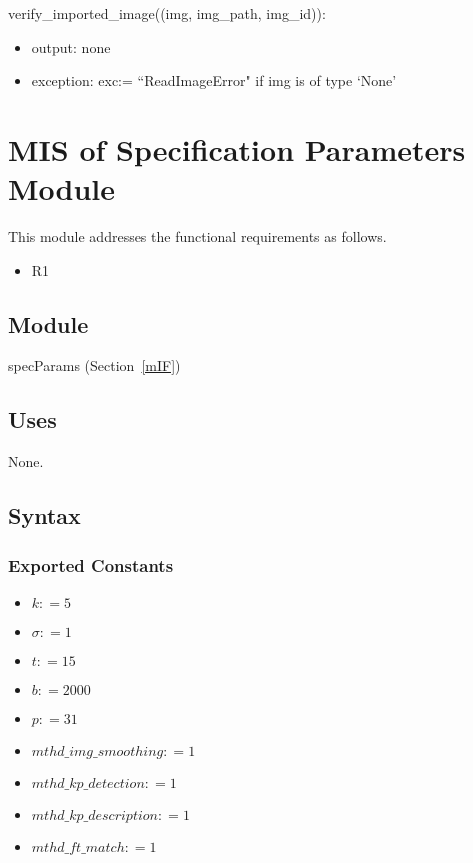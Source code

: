 \documentclass[12pt, titlepage]{article}
\begin{document}
\noindent verify\_imported\_image((img, img\_path, img\_id)):
\begin{itemize}
  \item output: none
  \item exception: exc:= ``ReadImageError" if img is of type `None'
\end{itemize}


\section{MIS of Specification Parameters Module} \label{mSP}
This module addresses the functional requirements as follows.
\begin{itemize}
  \item R1
\end{itemize}

\subsection{Module}
specParams (Section~\ref{mIF})

\subsection{Uses}
None.

\subsection{Syntax}

\subsubsection{Exported Constants}
\begin{itemize}
  \item $k: = 5$
  \item $\sigma: = 1$ 
  \item $t: = 15$ 
  \item $b: = 2000$ 
  \item $p: = 31$ 
  \item $mthd\_img\_smoothing: = 1$
  \item $mthd\_kp\_detection: = 1$ 
  \item $mthd\_kp\_description: = 1$
  \item $mthd\_ft\_match: = 1$
\end{itemize}
\end{document}
